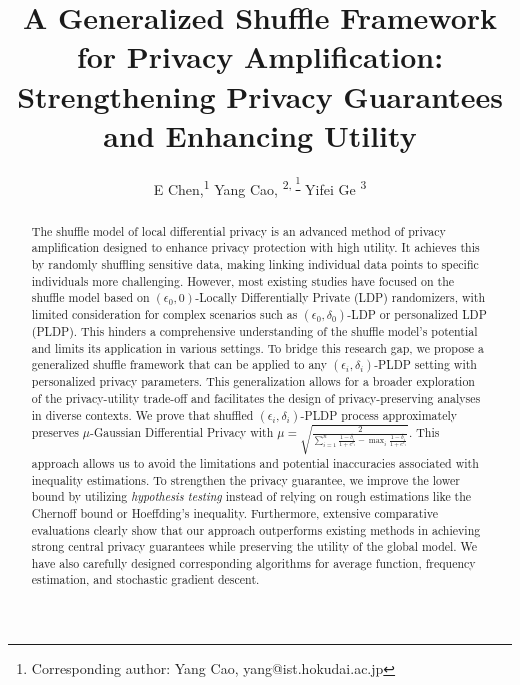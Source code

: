 \documentclass[letterpaper]{article} %
\title{A Generalized Shuffle Framework for Privacy Amplification: Strengthening Privacy Guarantees and Enhancing Utility}
\author {
    E Chen,\textsuperscript{\rm 1}
    Yang Cao, \textsuperscript{\rm 2, \thanks{Corresponding author: Yang Cao, yang@ist.hokudai.ac.jp }}
    Yifei Ge \textsuperscript{\rm 3}
}
\begin{document}
\maketitle

\begin{abstract}
The shuffle model of local differential privacy is an advanced method of privacy amplification designed to enhance privacy protection with high utility.
It achieves this by randomly shuffling sensitive data, making linking individual data points to specific individuals more challenging.
However, most existing studies have focused on the shuffle model based on
$(\epsilon_0,0)$-Locally Differentially Private (LDP) randomizers, with limited consideration for complex scenarios such as $(\epsilon_0,\delta_0)$-LDP or personalized LDP (PLDP).
This hinders a comprehensive understanding of the shuffle model's potential and limits its application in various settings.
To bridge this research gap, we propose a generalized shuffle framework that can be applied to any
$(\epsilon_i,\delta_i)$-PLDP setting with personalized privacy parameters.
This generalization allows for a broader exploration of the privacy-utility trade-off and facilitates the design of privacy-preserving analyses in diverse contexts.
We prove that shuffled $(\epsilon_i,\delta_i)$-PLDP process approximately preserves $\mu$-Gaussian Differential Privacy with $
\mu = \sqrt{\frac{2}{\sum_{i=1}^{n} \frac{1-\delta_i}{1+e^{\epsilon_i}}-\max_{i}{\frac{1-\delta_{i}}{1+e^{\epsilon_{i}}}}}}.
$
This approach allows us to avoid the limitations and potential inaccuracies associated with inequality estimations.
To strengthen the privacy guarantee, we improve the lower bound by utilizing \textit{hypothesis testing} instead of relying on rough estimations like the Chernoff bound or Hoeffding's inequality.
Furthermore, extensive comparative evaluations clearly show that our approach outperforms existing methods in achieving strong central privacy guarantees while preserving the utility of the global model.
We have also carefully designed corresponding algorithms for average function, frequency estimation, and stochastic gradient descent.
\end{abstract}
\end{document}
